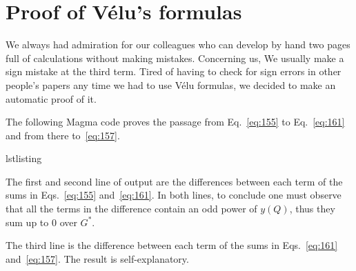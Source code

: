 \chapter{Proof of Vélu's formulas}
\label{cha:proof-velus-formulas}

We always had admiration for our colleagues who can develop by hand
two pages full of calculations without making mistakes. Concerning us,
We usually make a sign mistake at the third term. Tired of having to
check for sign errors in other people's papers any time we had to use
Vélu formulas, we decided to make an automatic proof of it.

The following Magma code proves the passage from Eq.~\eqref{eq:155} to
Eq.~\eqref{eq:161} and from there to~\eqref{eq:157}.

\begin{xcomment}{lstlisting}

\end{xcomment}

The first and second line of output are the differences between each
term of the sums in Eqs.~\eqref{eq:155} and~\eqref{eq:161}. In both
lines, to conclude one must observe that all the terms in the
difference contain an odd power of $y(Q)$, thus they sum up to $0$
over $G^\ast$.

The third line is the difference between each term of the sums in
Eqs.~\eqref{eq:161} and~\eqref{eq:157}. The result is
self-explanatory.


